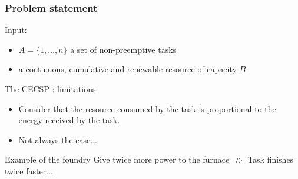\begin{frame}
  \frametitle{Problem statement}
  \vfill
  Input:\\
  \begin{itemize}
  \item $A=\{1,\hdots,n\}$ a set of non-preemptive tasks
  \item a continuous, cumulative and renewable resource of capacity  $B$
  \end{itemize}
  \vfill
  \begin{overlayarea}{\linewidth}{1cm}
  \end{overlayarea}
\end{frame}



\begin{frame}{The CECSP : limitations}
  \vfill
  \begin{itemize}
  \item Consider that the resource consumed by the task is proportional to
    the energy received by the task.
    \vfill
    \pause
  \item Not always the case...
  \end{itemize}
  \vfill
  \pause
  \begin{block}{Example of the foundry}
    Give twice more power to the furnace $\not\Rightarrow$ Task
    finishes twice faster... 
  \end{block}
  \vfill

\end{frame}



